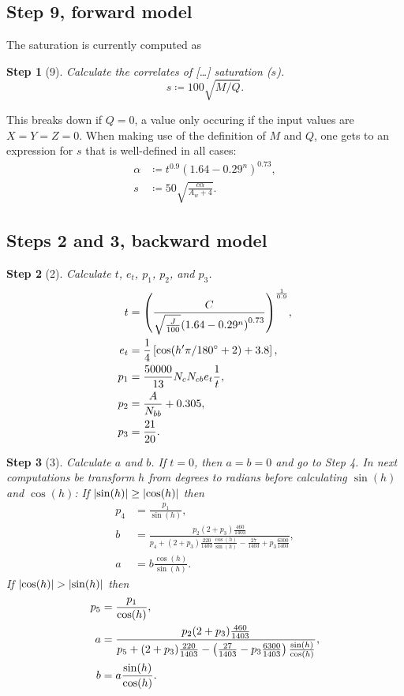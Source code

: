 \documentclass[twocolumn]{scrartcl}
\theoremstyle{named}
\newtheorem*{step}{Step}
\DeclarePairedDelimiter\abs{\lvert}{\rvert}%
\begin{document}
\subsection{Step 9, forward model}

The saturation is currently computed as
\begin{step}[9]
  Calculate the correlates of [\dots] saturation ($s$).
  \[
    s \coloneqq 100 \sqrt{M/Q}.
  \]
\end{step}
This breaks down if $Q=0$, a value only occuring if the input values are
$X=Y=Z=0$. When making use of the definition of $M$ and $Q$, one gets to an
expression for $s$ that is well-defined in all cases:
\begin{align}
  \label{eq:alpha}
  \alpha&\coloneqq t^{0.9} {(1.64-0.29^n)}^{0.73},\\
  \nonumber
  s &\coloneqq 50 \sqrt{\frac{c\alpha}{A_w + 4}}.
\end{align}


\subsection{Steps 2 and 3, backward model}

\begin{step}[2]
Calculate $t$, $e_t$, $p_1$, $p_2$, and $p_3$.
\begin{align*}
  t &= {\left(\frac{C}{\sqrt{\frac{J}{100}} {(1.64 - 0.29^n)}^{0.73}}\right)}^\frac{1}{0.9},\\
  e_t &= \frac{1}{4} \left[\cos(h'\pi/180\degree + 2) + 3.8\right],\\
  p_1 &= \frac{50000}{13} N_c N_{cb} e_t \frac{1}{t},\\
  p_2 &= \frac{A}{N_{bb}} + 0.305,\\
  p_3 &= \frac{21}{20}.
\end{align*}
\end{step}

\begin{step}[3]
Calculate $a$ and $b$.
If $t=0$, then $a=b=0$ and go to Step 4.
In next computations be transform $h$ from degrees to radians
before calculating $\sin(h)$ and $\cos(h)$:
If $\abs{\sin(h)} \ge \abs{\cos(h)}$ then
\begin{align*}
  p_4 &= \frac{p_1}{\sin(h)},\\
  b &= \frac{p_2 (2+p_3) \frac{460}{1403}}{p_4 + (2+p_3) \frac{220}{1403} \frac{\cos(h)}{\sin(h)} - \frac{27}{1403} + p_3 \frac{6300}{1403}},\\
  a &= b \frac{\cos(h)}{\sin(h)}.
\end{align*}
If $\abs{\cos(h)} > \abs{\sin(h)}$ then
\begin{align*}
  p_5 &= \frac{p_1}{\cos(h)},\\
  a &= \frac{p_2 (2+p_3) \frac{460}{1403}}{%
    p_5
    + (2+p_3) \frac{220}{1403} -
    \left(\frac{27}{1403}  - p_3 \frac{6300}{1403}\right) \frac{\sin(h)}{\cos(h)}
  },\\
  b &= a \frac{\sin(h)}{\cos(h)}.
\end{align*}
\end{step}
\end{document}
